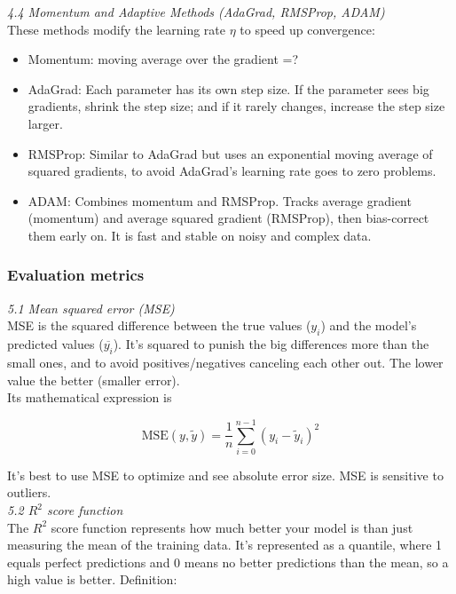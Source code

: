 \documentclass[amssymb,twocolumn,aps]{revtex4}
\begin{document}
\textit{4.4 Momentum and Adaptive Methods (AdaGrad, RMSProp, ADAM) } \\

These methods modify the learning rate $\eta$ to speed up convergence: 

\begin{itemize}
    \item Momentum: moving average over the gradient =?
    \item AdaGrad: Each parameter has its own step size. If the parameter sees big gradients, shrink the step size; and if it rarely changes, increase the step size larger. 
    \item RMSProp: Similar to AdaGrad but uses an exponential moving average of squared gradients, to avoid AdaGrad's learning rate goes to zero problems. 
    \item ADAM: Combines momentum and RMSProp. Tracks average gradient (momentum) and average squared gradient (RMSProp), then bias-correct them early on. It is fast and stable on noisy and complex data. 
\end{itemize}

\subsubsection{Evaluation metrics}

\textit{5.1 Mean squared error (MSE)} \\

MSE is the squared difference between the true values ($y_i$) and the model's predicted values ($\overline{y_i}$). It's squared to punish the big differences more than the small ones, and to avoid positives/negatives canceling each other out. The lower value the better (smaller error). \\

Its mathematical expression is 

\begin{equation}
    \text{MSE}(y, \tilde{y}) = \frac{1}{n} \sum_{i=0}^{n-1} (y_i - \tilde{y}_i)^2 
\end{equation}

It's best to use MSE to optimize and see absolute error size. MSE is sensitive to outliers. \\

\textit{5.2 $R^2$ score function} \\

The $R^2$ score function represents how much better your model is than just measuring the mean of the training data. It's represented as a quantile, where 1 equals perfect predictions and 0 means no better predictions than the mean, so a high value is better. Definition: 
\end{document}
